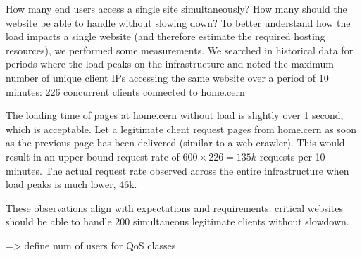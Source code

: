 How many end users access a single site simultaneously?
How many should the website be able to handle without slowing down?
To better understand how the load impacts a single website (and therefore estimate the required hosting resources),
we performed some measurements.
We searched in historical data for periods where the load peaks on the infrastructure
and noted the maximum number of unique client IPs accessing the same website over a period of 10 minutes:
226 concurrent clients connected to home.cern

The loading time of pages at home.cern without load is slightly over 1 second, which is acceptable.
Let a legitimate client request pages from home.cern as soon as the previous page has been delivered (similar to a web crawler).
This would result in an upper bound request rate of $600 \times 226 = 135k$ requests per 10 minutes.
The actual request rate observed across the entire infrastructure when load peaks is much lower, 46k.

These observations align with expectations and requirements: critical websites should be able to handle 200 simultaneous legitimate clients without slowdown.

=> define num of users for QoS classes




